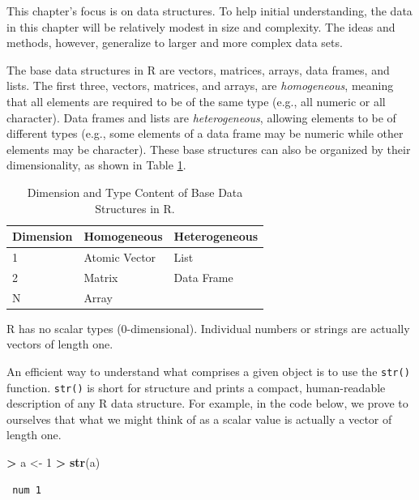 \documentclass[]{krantz}
\makeatletter
\newenvironment{Shaded}{\begin{snugshade}}{\end{snugshade}}
\newcommand{\KeywordTok}[1]{\textcolor[rgb]{0.27,0.27,0.27}{\textbf{#1}}}
\newcommand{\DecValTok}[1]{\textcolor[rgb]{0.06,0.06,0.06}{#1}}
\newcommand{\StringTok}[1]{\textcolor[rgb]{0.5,0.5,0.5}{#1}}
\newcommand{\OperatorTok}[1]{\textcolor[rgb]{0.43,0.43,0.43}{\textbf{#1}}}
\newcommand{\NormalTok}[1]{#1}
\newenvironment{kframe}{%
\medskip{}
\setlength{\fboxsep}{.8em}
 \def\at@end@of@kframe{}%
 \ifinner\ifhmode%
  \def\at@end@of@kframe{\end{minipage}}%
  \begin{minipage}{\columnwidth}%
 \fi\fi%
 \def\FrameCommand##1{\hskip\@totalleftmargin \hskip-\fboxsep
 \colorbox{shadecolor}{##1}\hskip-\fboxsep
     \hskip-\linewidth \hskip-\@totalleftmargin \hskip\columnwidth}%
 \MakeFramed {\advance\hsize-\width
   \@totalleftmargin\z@ \linewidth\hsize
   \@setminipage}}%
 {\par\unskip\endMakeFramed%
 \at@end@of@kframe}
\renewenvironment{Shaded}{\begin{kframe}}{\end{kframe}}
\theoremstyle{definition}
\theoremstyle{definition}
\theoremstyle{definition}
\theoremstyle{remark}
\makeatother
\begin{document}
This chapter's focus is on data structures. To help initial
understanding, the data in this chapter will be relatively modest in
size and complexity. The ideas and methods, however, generalize to
larger and more complex data sets.

The base data structures in R are vectors, matrices, arrays, data
frames, and lists. The first three, vectors, matrices, and arrays, are
\emph{homogeneous}, meaning that all elements are required to be of the
same type (e.g., all numeric or all character). Data frames and lists
are \emph{heterogeneous}, allowing elements to be of different types
(e.g., some elements of a data frame may be numeric while other elements
may be character). These base structures can also be organized by their
dimensionality, as shown in Table \ref{tab:dataStructures}.

\begin{table}

\caption{\label{tab:dataStructures}Dimension and Type Content of Base Data Structures in R.}
\centering
\begin{tabular}[t]{lll}
\toprule
Dimension & Homogeneous & Heterogeneous\\
\midrule
1 & Atomic Vector & List\\
2 & Matrix & Data Frame\\
N & Array & \\
\bottomrule
\end{tabular}
\end{table}

R has no scalar types (0-dimensional). Individual numbers or strings are
actually vectors of length one.

An efficient way to understand what comprises a given object is to use
the \texttt{str()} function. \texttt{str()} is short for structure and
prints a compact, human-readable description of any R data structure.
For example, in the code below, we prove to ourselves that what we might
think of as a scalar value is actually a vector of length one.

\begin{Shaded}
\begin{Highlighting}[]
\OperatorTok{>}\StringTok{ }\NormalTok{a <-}\StringTok{ }\DecValTok{1}
\OperatorTok{>}\StringTok{ }\KeywordTok{str}\NormalTok{(a)}
\end{Highlighting}
\end{Shaded}

\begin{verbatim}
 num 1
\end{verbatim}
\end{document}
